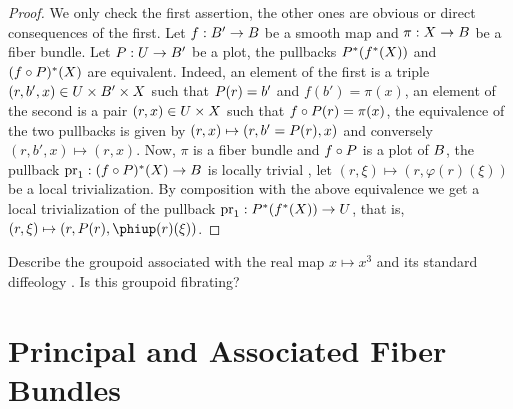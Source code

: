\begin{proof}
  We only check the first assertion,
  the other ones are obvious or direct consequences of the first.
  Let $f : \B' \to \B$ be a smooth map and $\pi : \X \to \B$ be a fiber bundle.
  Let $\P : \U \to \B'$ be a plot,
  the pullbacks $\P^*(f^*(\X))$ and $(f \circ \P)^*(\X)$ are equivalent.
  Indeed, an element of the first is a triple $(r,b',x) \in \U \times \B' \times \X$ such that $\P(r) = b'$ and $f(b') = \pi(x)$,
  an element of the second is a pair $(r,x) \in \U \times \X$ such that $f \circ \P(r) = \pi(x)$,
  the equivalence of the two pullbacks is given by $(r,x) \mapsto (r,b'=\P(r),x)$ and conversely $(r,b',x) \mapsto (r,x)$.
  Now,
  $\pi$ is a fiber bundle and $f \circ \P$ is a plot of $\B$,
  the pullback $\pr_1 : (f \circ \P)^*(\X) \to \B$ is locally trivial ,
  let $(r,\xi) \mapsto (r, \varphi(r)(\xi))$ be a local trivialization.
  By composition with the above equivalence we get a local trivialization of the pullback $\pr_1 : \P^*(f^*(\X)) \to \U$,
  that is,
  $(r,\xi) \mapsto (r, \P(r), \varphi(r)(\xi))$.
\end{proof}


%
%

\Exercise

\begin{exercise}
  \label{Groupoid-associated-with-x-x3}
  Describe the groupoid associated with the real map $x \mapsto x^3$ and its standard diffeology .
  Is this groupoid fibrating?
\end{exercise} %


\section*{Principal and Associated Fiber Bundles}
\label{Principal-and-associated-fiber-bundles}

